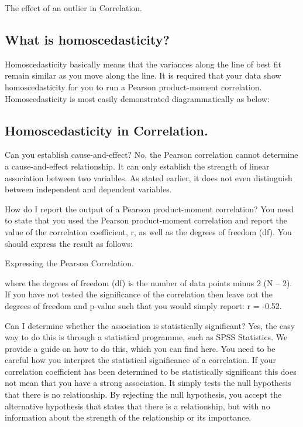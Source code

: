 \documentclass[]{article}
\begin{document}
The effect of an outlier in Correlation. 



\subsection{What is homoscedasticity?}
Homoscedasticity basically means that the variances along the line of best fit remain similar as you move along the line. It is required that your data show homoscedasticity for you to run a Pearson product-moment correlation. Homoscedasticity is most easily demonstrated diagrammatically as below:

\subsection{Homoscedasticity in Correlation.} 

Can you establish cause-and-effect?
No, the Pearson correlation cannot determine a cause-and-effect relationship. It can only establish the strength of linear association between two variables. As stated earlier, it does not even distinguish between independent and dependent variables.

How do I report the output of a Pearson product-moment correlation?
You need to state that you used the Pearson product-moment correlation and report the value of the correlation coefficient, r, as well as the degrees of freedom (df). You should express the result as follows:

Expressing the Pearson Correlation. 

where the degrees of freedom (df) is the number of data points minus 2 (N – 2). If you have not tested the significance of the correlation then leave out the degrees of freedom and p-value such that you would simply report: r = -0.52.



Can I determine whether the association is statistically significant?
Yes, the easy way to do this is through a statistical programme, such as SPSS Statistics. We provide a guide on how to do this, which you can find here. You need to be careful how you interpret the statistical significance of a correlation. If your correlation coefficient has been determined to be statistically significant this does not mean that you have a strong association. It simply tests the null hypothesis that there is no relationship. By rejecting the null hypothesis, you accept the alternative hypothesis that states that there is a relationship, but with no information about the strength of the relationship or its importance.
\end{document}
